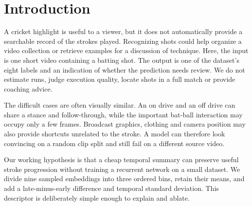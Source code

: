\begin{abstract}
Recognizing a cricket shot from one frame can be difficult when the bat is blurred or the stroke has not yet developed. We study a small, CPU-only system for classifying trimmed videos into eight shot categories. Our proposed representation combines ordered averages of early, middle and late frame embeddings with their temporal difference and spread. It uses a frozen ImageNet MobileNetV2 encoder and a class-balanced linear classifier. The contribution is a compact, inspectable design and a controlled evaluation of its components, rather than a new backbone or a claim of state-of-the-art performance. We evaluate 562 real clips with source groups kept disjoint across training, validation and test sets. The proposed model obtains 30.2\% accuracy and 21.3\% macro F1 on 116 held-out clips, compared with 19.8\% and 18.6\% for a middle-frame baseline. The proposed representation exceeds the middle-frame macro F1 by 2.7 percentage points. The local demo shows the sampled sequence, all class scores and a validation-chosen review decision. Results and limitations are supported by saved predictions and reproducible code.
\end{abstract}

\section{Introduction}
A cricket highlight is useful to a viewer, but it does not automatically provide a searchable record of the strokes played. Recognizing shots could help organize a video collection or retrieve examples for a discussion of technique. Here, the input is one short video containing a batting shot. The output is one of the dataset's eight labels and an indication of whether the prediction needs review. We do not estimate runs, judge execution quality, locate shots in a full match or provide coaching advice.

The difficult cases are often visually similar. An on drive and an off drive can share a stance and follow-through, while the important bat-ball interaction may occupy only a few frames. Broadcast graphics, clothing and camera position may also provide shortcuts unrelated to the stroke. A model can therefore look convincing on a random clip split and still fail on a different source video.

Our working hypothesis is that a cheap temporal summary can preserve useful stroke progression without training a recurrent network on a small dataset. We divide nine sampled embeddings into three ordered bins, retain their means, and add a late-minus-early difference and temporal standard deviation. This descriptor is deliberately simple enough to explain and ablate.

